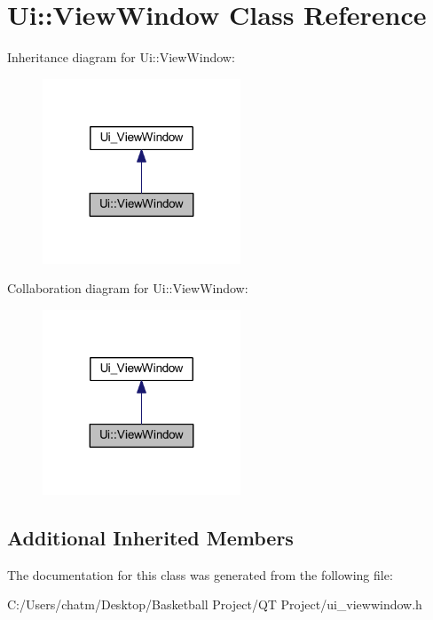 \hypertarget{class_ui_1_1_view_window}{}\section{Ui\+::View\+Window Class Reference}
\label{class_ui_1_1_view_window}


Inheritance diagram for Ui\+::View\+Window\+:\nopagebreak
\begin{figure}[H]
\begin{center}
\leavevmode
\includegraphics[width=167pt]{class_ui_1_1_view_window__inherit__graph}
\end{center}
\end{figure}


Collaboration diagram for Ui\+::View\+Window\+:\nopagebreak
\begin{figure}[H]
\begin{center}
\leavevmode
\includegraphics[width=167pt]{class_ui_1_1_view_window__coll__graph}
\end{center}
\end{figure}
\subsection*{Additional Inherited Members}


The documentation for this class was generated from the following file\+:\begin{DoxyCompactItemize}
\item 
C\+:/\+Users/chatm/\+Desktop/\+Basketball Project/\+Q\+T Project/ui\+\_\+viewwindow.\+h\end{DoxyCompactItemize}
